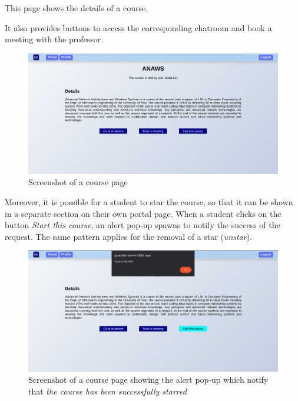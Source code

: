 This page shows the details of a course.

It also provides buttons to access the corresponding chatroom and book a meeting with the professor.

\begin{figure}[H]
    \centering
    \includegraphics[width=\textwidth]{img/user_manual/student/student-course-1.png}
    \caption{Screenshot of a course page}
\end{figure}

Moreover, it is possible for a student to star the course, so that it can be shown in a separate section on their own portal page. When a student clicks on the button \textit{Start this course}, an alert pop-up spawns to notify the success of the request. The same pattern applies for the removal of a star (\textit{unstar}).

\begin{figure}[H]
    \centering
    \includegraphics[width=\textwidth]{img/user_manual/student/student-course-2.png}
    \caption{Screenshot of a course page showing the alert pop-up which notify that \textit{the course has been successfully starred}}
\end{figure}
